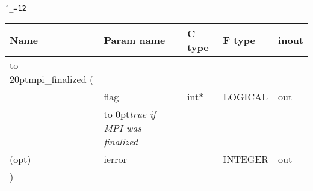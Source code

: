 \begingroup\tt\catcode`\_=12
\begin{tabular}{lllll}
\toprule
\textrm{Name}&\textrm{Param name}&\textrm{C type}&\textrm{F type}&\textrm{inout}\\
\midrule
\hbox to 20pt{mpi_finalized (\hss} \\
&flag&int*&LOGICAL&out\\ [-3pt]
&\hbox to 0pt{\footnotesize\sl true if MPI was finalized\hss}\\
(opt)&ierror&&INTEGER&out\\
)\\
\bottomrule
\end{tabular}
\endgroup

